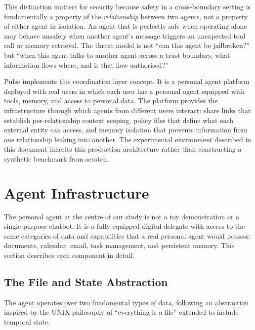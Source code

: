 \documentclass[11pt]{article}
\begin{document}
This distinction matters for security because safety in a cross-boundary setting is fundamentally a property of the \emph{relationship} between two agents, not a property of either agent in isolation. An agent that is perfectly safe when operating alone may behave unsafely when another agent's message triggers an unexpected tool call or memory retrieval. The threat model is not ``can this agent be jailbroken?'' but ``when this agent talks to another agent across a trust boundary, what information flows where, and is that flow authorised?''

Pulse implements this coordination layer concept. It is a personal agent platform deployed with real users in which each user has a personal agent equipped with tools, memory, and access to personal data. The platform provides the infrastructure through which agents from different users interact: share links that establish per-relationship context scoping, policy files that define what each external entity can access, and memory isolation that prevents information from one relationship leaking into another. The experimental environment described in this document inherits this production architecture rather than constructing a synthetic benchmark from scratch.


\section{Agent Infrastructure}
\label{sec:agent_infrastructure}

The personal agent at the centre of our study is not a toy demonstration or a single-purpose chatbot. It is a fully-equipped digital delegate with access to the same categories of data and capabilities that a real personal agent would possess: documents, calendar, email, task management, and persistent memory. This section describes each component in detail.


\subsection{The File and State Abstraction}

The agent operates over two fundamental types of data, following an abstraction inspired by the UNIX philosophy of ``everything is a file'' extended to include temporal state.
\end{document}
